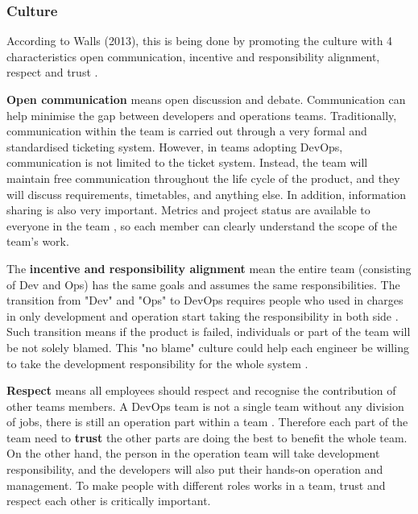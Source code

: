 \subsubsection[]{Culture}
 According to Walls (2013), this is being done by promoting the culture with 4 characteristics open communication, incentive and responsibility alignment, respect and trust \cite{walls2013building}.
\par 
\textbf{Open communication} means open discussion and debate. Communication can help minimise the gap between developers and operations teams. Traditionally, communication within the team is carried out through a very formal and standardised ticketing system.
However, in teams adopting DevOps, communication is not limited to the ticket system. Instead, the team will maintain free communication throughout the life cycle of the product, and they will discuss requirements, timetables, and anything else. In addition, information sharing is also very important\cite{lwakatare2015dimensions}. Metrics and project status are available to everyone in the team \label{moniter}, so each member can clearly understand the scope of the team's work.
\par
The \textbf{incentive and responsibility alignment} mean the entire team (consisting of Dev and Ops) has the same goals and assumes the same responsibilities. The transition from "Dev" and "Ops" to DevOps requires people who used in charges in only development and operation start taking the responsibility in both side \cite{lwakatare2015dimensions}.
Such transition means if the product is failed, individuals or part of the team will be not solely blamed. 
This "no blame" culture could help each engineer be willing to take the development responsibility for the whole system \cite{feitelson2013development}.
\par 
\textbf{Respect} means all employees should respect and recognise the contribution of other teams members. A DevOps team is not a single team without any division of jobs, there is still an operation part within a team \cite{TheresNo86:online}. Therefore each part of the team need to \textbf{trust} the other parts are doing the best to benefit the whole team.
On the other hand, the person in the operation team will take development responsibility, and the developers will also put their hands-on operation and management\cite{shropshire2017uncertainty}. To make people with different roles works in a team, trust and respect each other is critically important. 
